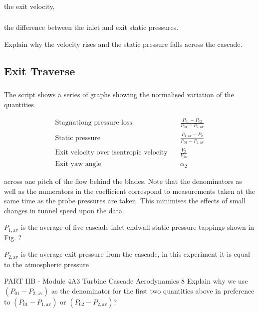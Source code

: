 \documentclass{article}
\begin{document}
\subsubsection{}
the exit velocity,

\subsubsection{}
the difference between the inlet and exit static pressures.

Explain why the velocity rises and the static pressure falls across the cascade.

\subsection{Exit Traverse}
\subsubsection{}

The script shows a series of graphs showing the normalised variation of the quantities

\begin{align*}
    \text{Stagnationg pressure loss} \quad & \frac{P_{01} - P_{02}}{P_{01} - P_{2,\text{av}}} \\
    \text{Static pressure} \quad & \frac{P_{1,\text{av}} - P_2}{P_{01} - P_{2,\text{av}}} \\
    \text{Exit velocity over isentropic velocity} \quad & \frac{V_2}{V_{2\text{s}}} \\
    \text{Exit yaw angle} \quad & \alpha_2
\end{align*}

across one pitch of the flow behind the blades. Note that the denominators as well as the
numerators in the coefficient correspond to measurements taken at the same time as the probe
pressures are taken. This minimises the effects of small changes in tunnel speed upon the data.

$P_{1,\text{av}}$ is the average of five cascade inlet endwall static pressure tappings shown in Fig. ?

$P_{2,\text{av}}$ is the average exit pressure from the cascade, in this experiment it is equal to the
atmospheric pressure

PART IIB - Module 4A3 Turbine Cascade Aerodynamics
8
Explain why we use $(P_{01} - P_{2,\text{av}})$ as the denominator for the first two quantities above in
preference to $(P_{01} - P_{1,\text{av}})$ or $(P_{02} - P_{2,\text{av}})$?
\end{document}
